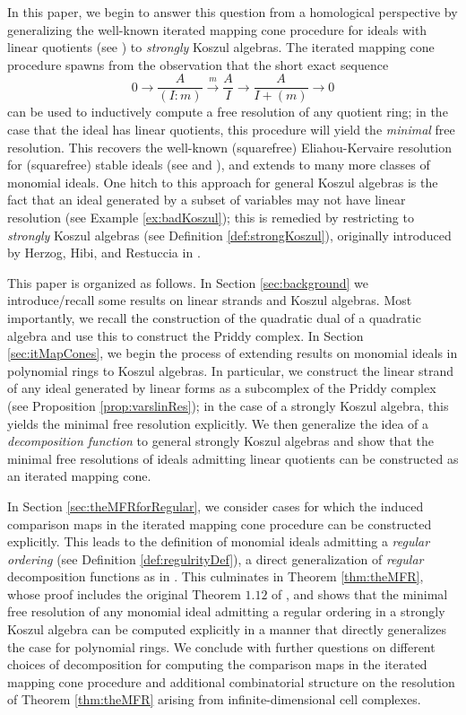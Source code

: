 \documentclass[10pt]{amsart}
\theoremstyle{definition}
\theoremstyle{remark}
\newtheorem{the context}[theorem]{The Context}
\numberwithin{equation}{theorem}
\numberwithin{equation}{section}
\begin{document}
In this paper, we begin to answer this question from a homological perspective by generalizing the well-known iterated mapping cone procedure for ideals with linear quotients (see \cite{herzog2002resolutions}) to \emph{strongly} Koszul algebras. The iterated mapping cone procedure spawns from the observation that the short exact sequence
$$0 \to \frac{A}{(I:m)} \xrightarrow[]{m} \frac{A}{I} \xrightarrow[]{} \frac{A}{I +(m)} \to 0$$
can be used to inductively compute a free resolution of any quotient ring; in the case that the ideal has linear quotients, this procedure will yield the \emph{minimal} free resolution. This recovers the well-known (squarefree) Eliahou-Kervaire resolution for (squarefree) stable ideals (see \cite{eliahou1990minimal} and \cite{aramova1998squarefree}), and extends to many more classes of monomial ideals. One hitch to this approach for general Koszul algebras is the fact that an ideal generated by a subset of variables may not have linear resolution (see Example \ref{ex:badKoszul}); this is remedied by restricting to \emph{strongly} Koszul algebras (see Definition \ref{def:strongKoszul}), originally introduced by Herzog, Hibi, and Restuccia in \cite{herzog2000strongly}.  

This paper is organized as follows. In Section \ref{sec:background} we introduce/recall some results on linear strands and Koszul algebras. Most importantly, we recall the construction of the quadratic dual of a quadratic algebra and use this to construct the Priddy complex. In Section \ref{sec:itMapCones}, we begin the process of extending results on monomial ideals in polynomial rings to Koszul algebras. In particular, we construct the linear strand of any ideal generated by linear forms as a subcomplex of the Priddy complex (see Proposition \ref{prop:varslinRes}); in the case of a strongly Koszul algebra, this yields the minimal free resolution explicitly. We then generalize the idea of a \emph{decomposition function} to general strongly Koszul algebras and show that the minimal free resolutions of ideals admitting linear quotients can be constructed as an iterated mapping cone. 

In Section \ref{sec:theMFRforRegular}, we consider cases for which the induced comparison maps in the iterated mapping cone procedure can be constructed explicitly. This leads to the definition of monomial ideals admitting a \emph{regular ordering} (see Definition \ref{def:regulrityDef}), a direct generalization of \emph{regular} decomposition functions as in \cite{herzog2002resolutions}. This culminates in Theorem \ref{thm:theMFR}, whose proof includes the original Theorem $1.12$ of \cite{herzog2002resolutions}, and shows that the minimal free resolution of any monomial ideal admitting a regular ordering in a strongly Koszul algebra can be computed explicitly in a manner that directly generalizes the case for polynomial rings. We conclude with further questions on different choices of decomposition for computing the comparison maps in the iterated mapping cone procedure and additional combinatorial structure on the resolution of Theorem \ref{thm:theMFR} arising from infinite-dimensional cell complexes.
\end{document}

